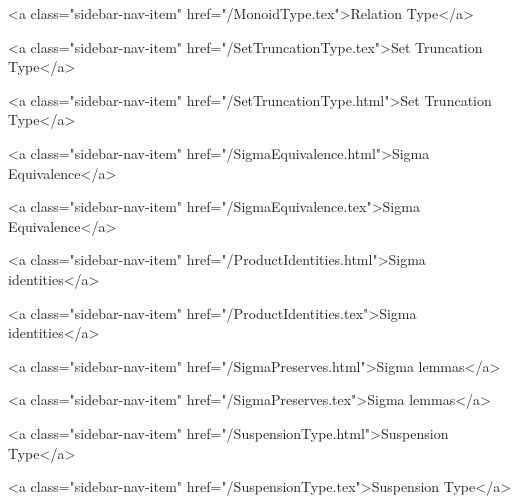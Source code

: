       
    
      
        
          <a class="sidebar-nav-item" href="/MonoidType.tex">Relation Type</a>
        
      
    
      
        
          <a class="sidebar-nav-item" href="/SetTruncationType.tex">Set Truncation Type</a>
        
      
    
      
        
          <a class="sidebar-nav-item" href="/SetTruncationType.html">Set Truncation Type</a>
        
      
    
      
        
          <a class="sidebar-nav-item" href="/SigmaEquivalence.html">Sigma Equivalence</a>
        
      
    
      
        
          <a class="sidebar-nav-item" href="/SigmaEquivalence.tex">Sigma Equivalence</a>
        
      
    
      
        
          <a class="sidebar-nav-item" href="/ProductIdentities.html">Sigma identities</a>
        
      
    
      
        
          <a class="sidebar-nav-item" href="/ProductIdentities.tex">Sigma identities</a>
        
      
    
      
        
          <a class="sidebar-nav-item" href="/SigmaPreserves.html">Sigma lemmas</a>
        
      
    
      
        
          <a class="sidebar-nav-item" href="/SigmaPreserves.tex">Sigma lemmas</a>
        
      
    
      
        
          <a class="sidebar-nav-item" href="/SuspensionType.html">Suspension Type</a>
        
      
    
      
        
          <a class="sidebar-nav-item" href="/SuspensionType.tex">Suspension Type</a>
        
